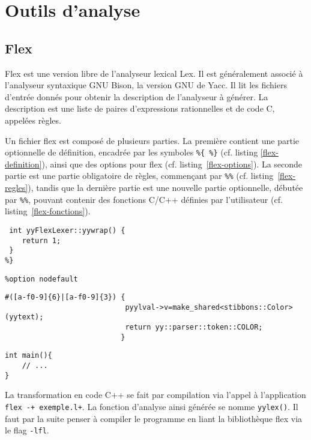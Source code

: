 \section{Outils d'analyse}

\subsection{Flex}

Flex est une version libre de l'analyseur lexical Lex. Il est généralement associé à l'analyseur syntaxique GNU Bison, la version GNU de Yacc.
Il lit les fichiers d'entrée donnés pour obtenir la description de l'analyseur à générer. La description est une liste de paires d'expressions rationnelles et de code C, appelées règles. 

Un fichier flex est composé de plusieurs parties. La première contient une partie optionnelle de définition, encadrée par les symboles \verb|%{ %}| (cf. listing \ref{flex-definition}), ainsi que des options pour flex (cf. listing~\ref{flex-options}). La seconde partie est une partie obligatoire de règles, commençant par \verb|%%| (cf. listing~\ref{flex-regles}), tandis que la dernière partie est une nouvelle partie optionnelle, débutée par \verb|%%|, pouvant contenir des fonctions C/C++ définies par l'utilisateur (cf. listing~\ref{flex-fonctions}).

\begin{lstlisting}[caption=Partie définition d'un fichier flex,label=flex-definition]
%{
 int yyFlexLexer::yywrap() {
	return 1;
 }
%}
\end{lstlisting}

\begin{lstlisting}[caption=Options flex,label=flex-options]
%option c++ 
%option nodefault 
\end{lstlisting}

\begin{lstlisting}[label=flex-regles,caption=Partie règles de flex]
%%
#([a-f0-9]{6}|[a-f0-9]{3}) {
							pyylval->v=make_shared<stibbons::Color>(yytext); 
							return yy::parser::token::COLOR;
						   }
\end{lstlisting}
\begin{lstlisting}[label=flex-fonctions,caption=Partie fonctions de flex]
%%
int main(){
	// ...
}
\end{lstlisting}

La transformation en code C++ se fait par compilation via l'appel à l'application \verb|flex -+ exemple.l+|. La fonction d'analyse ainsi générée se nomme \verb|yylex()|.
Il faut par la suite penser à compiler le programme en liant la bibliothèque flex via le flag \verb|-lfl|.

